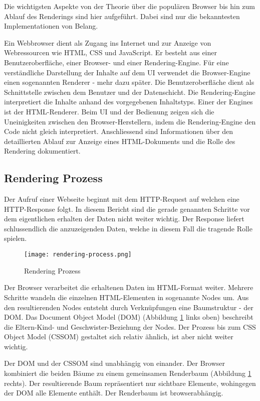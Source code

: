 Die wichtigsten Aspekte von der Theorie über die populären Browser bis hin zum Ablauf des Renderings sind hier aufgeführt.
Dabei sind nur die bekanntesten Implementationen von Belang.

Ein Webbrowser dient als Zugang ins Internet und zur Anzeige von Webressourcen wie HTML, CSS und JavaScript.
Er besteht aus einer Benutzeroberfläche, einer Browser- und einer Rendering-Engine.
Für eine verständliche Darstellung der Inhalte auf dem UI verwendet die Browser-Engine einen sogenannten Renderer - mehr dazu später.
Die Benutzeroberfläche dient als Schnittstelle zwischen dem Benutzer und der Datenschicht. 
Die Rendering-Engine interpretiert die Inhalte anhand des vorgegebenen Inhaltstyps. 
Einer der Engines ist der HTML-Renderer.
Beim UI und der Bedienung zeigen sich die Uneinigkeiten zwischen den Browser-Herstellern, indem die Rendering-Engine den Code nicht gleich interpretiert.
Anschliessend sind Informationen über den detaillierten Ablauf zur Anzeige eines HTML-Dokuments und die Rolle des Rendering dokumentiert.


\subsection{Rendering Prozess}
\label{sec:structureRendering}

Der Aufruf einer Webseite beginnt mit dem HTTP-Request auf welchen eine HTTP-Response folgt.
In diesem Bericht sind die gerade genannten Schritte vor dem eigentlichen erhalten der Daten nicht weiter wichtig.
Der Response liefert schlussendlich die anzuzeigenden Daten, welche in diesem Fall die tragende Rolle spielen.

\begin{figure}[!htb]
    \centering
    \texttt{[image: rendering-process.png]}
    \caption{Rendering Prozess}
    \label{img:RenderingProcess}
\end{figure}

Der Browser verarbeitet die erhaltenen Daten im HTML-Format weiter.
Mehrere Schritte wandeln die einzelnen HTML-Elementen in sogenannte Nodes um. 
Aus den resultierenden Nodes entsteht durch Verknüpfungen eine Baumstruktur - der DOM.
Das Document Object Model (DOM) (Abbildung \ref{img:RenderingProcess} links oben) beschreibt die Eltern-Kind- und Geschwister-Beziehung der Nodes.
Der Prozess bis zum CSS Object Model (CSSOM) gestaltet sich relativ ähnlich, ist aber nicht weiter wichtig.

Der DOM und der CSSOM sind unabhängig von einander. 
Der Browser kombiniert die beiden Bäume zu einem gemeinsamen Renderbaum (Abbildung \ref{img:RenderingProcess} rechts).
Der resultierende Baum repräsentiert nur sichtbare Elemente, wohingegen der DOM alle Elemente enthält.
Der Renderbaum ist browserabhängig.

